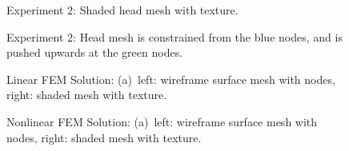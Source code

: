 \begin{figure}[h]
\centerline{}
\caption{Experiment 2: Shaded head mesh with texture.}
\label{fig:app5}
\end{figure}

\begin{figure}[h]
\centerline{}
\caption{Experiment 2: Head mesh is constrained from the blue nodes, and is pushed upwards at the green nodes.}
\label{fig:app6}
\end{figure}

\begin{figure}[h]
\centerline{}
\caption{Linear FEM Solution: (a)~left: wireframe surface mesh with nodes, right: shaded mesh with texture.}
\label{fig:app7}
\end{figure}

\begin{figure}[h]
\centerline{}
\caption{Nonlinear FEM Solution: (a)~left: wireframe surface mesh with nodes, right: shaded mesh with texture.}
\label{fig:app8}
\end{figure}
